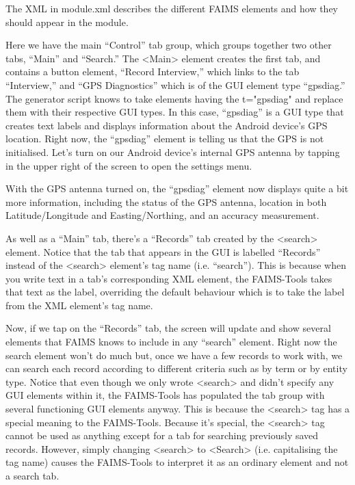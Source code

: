 The XML in module.xml describes the different FAIMS elements and how they should appear in the module.

Here we have the main “Control” tab group, which groups together two other tabs, “Main” and “Search.” The <Main> element creates the first tab, and contains a button element, “Record Interview,” which links to the tab “Interview,” and “GPS Diagnostics” which is of the GUI element type “gpsdiag.” The generator script knows to take elements having the t="gpsdiag" and replace them with their respective GUI types. In this case, “gpsdiag” is a GUI type that creates text labels and displays information about the Android device's GPS location. Right now, the “gpsdiag” element is telling us that the GPS is not initialised. Let's turn on our Android device's internal GPS antenna by tapping \from[url22] in the upper right of the screen to open the settings menu.

{}{}

With the GPS antenna turned on, the “gpsdiag” element now displays quite a bit more information, including the status of the GPS antenna, location in both Latitude/Longitude and Easting/Northing, and an accuracy measurement.

As well as a “Main” tab, there's a “Records” tab created by the <search> element. Notice that the tab that appears in the GUI is labelled “Records” instead of the <search> element's tag name (i.e. “search”). This is because when you write text in a tab's corresponding XML element, the FAIMS-Tools takes that text as the label, overriding the default behaviour which is to take the label from the XML element's tag name.

Now, if we tap on the “Records” tab, the screen will update and show several elements that FAIMS knows to include in any “search” element. Right now the search element won't do much but, once we have a few records to work with, we can search each record according to different criteria such as by term or by entity type. Notice that even though we only wrote <search> and didn't specify any GUI elements within it, the FAIMS-Tools has populated the tab group with several functioning GUI elements anyway. This is because the <search> tag has a special meaning to the FAIMS-Tools. Because it's special, the <search> tag cannot be used as anything except for a tab for searching previously saved records. However, simply changing <search> to <Search> (i.e. capitalising the tag name) causes the FAIMS-Tools to interpret it as an ordinary element and not a search tab.

